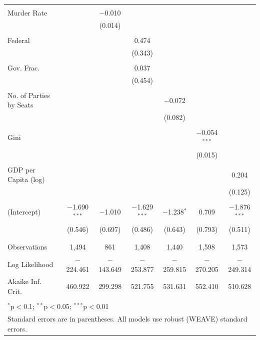 \documentclass[a4paper]{article}\usepackage[]{graphicx}\usepackage[]{color}
\begin{document}
\begin{table}
\begin{center}
{\begin{tabular}{@{\extracolsep{5pt}}lcccccc}
  & & & & & & \\ 
 Murder Rate &  & $-$0.010 &  &  &  &  \\ 
  &  & (0.014) &  &  &  &  \\ 
  & & & & & & \\ 
 Federal &  &  & 0.474 &  &  &  \\ 
  &  &  & (0.343) &  &  &  \\ 
  & & & & & & \\ 
 Gov. Frac. &  &  & 0.037 &  &  &  \\ 
  &  &  & (0.454) &  &  &  \\ 
  & & & & & & \\ 
 No. of Parties by Seats &  &  &  & $-$0.072 &  &  \\ 
  &  &  &  & (0.082) &  &  \\ 
  & & & & & & \\ 
 Gini &  &  &  &  & $-$0.054$^{***}$ &  \\ 
  &  &  &  &  & (0.015) &  \\ 
  & & & & & & \\ 
 GDP per Capita (log) &  &  &  &  &  & 0.204 \\ 
  &  &  &  &  &  & (0.125) \\ 
  & & & & & & \\ 
 (Intercept) & $-$1.690$^{***}$ & $-$1.010 & $-$1.629$^{***}$ & $-$1.238$^{*}$ & 0.709 & $-$1.876$^{***}$ \\ 
  & (0.546) & (0.697) & (0.486) & (0.643) & (0.793) & (0.511) \\ 
  & & & & & & \\ 
\hline \\[-1.8ex] 
Observations & 1,494 & 861 & 1,408 & 1,440 & 1,598 & 1,573 \\ 
Log Likelihood & $-$224.461 & $-$143.649 & $-$253.877 & $-$259.815 & $-$270.205 & $-$249.314 \\ 
Akaike Inf. Crit. & 460.922 & 299.298 & 521.755 & 531.631 & 552.410 & 510.628 \\ 
\hline 
\hline \\[-1.8ex] 
\multicolumn{7}{l}{$^{*}$p$<$0.1; $^{**}$p$<$0.05; $^{***}$p$<$0.01} \\ 
\multicolumn{7}{l}{Standard errors are in parentheses. All models use robust (WEAVE) standard errors.} \\ 
\end{tabular} 

}
\end{center}
\end{table}
\end{document}
